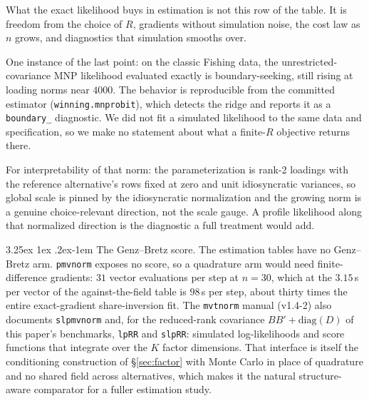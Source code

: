 \documentclass[11pt]{article}
\makeatletter
\renewcommand\paragraph{\@startsection{paragraph}{4}{\z@}%
  {3.25ex \@plus1ex \@minus.2ex}{-1em}%
  {\normalfont\normalsize\itshape}}
\makeatother
\begin{document}
What the exact likelihood buys in estimation is not this row of the
table. It is freedom from the choice of $R$, gradients without simulation
noise, the cost law as $n$ grows, and diagnostics that simulation smooths
over.

One instance of the last point: on the classic Fishing data, the
unrestricted-covariance MNP likelihood evaluated exactly is
boundary-seeking, still rising at loading norms near $4000$. The behavior is
reproducible from the committed estimator (\texttt{winning.mnprobit}),
which detects the ridge and reports it as a \texttt{boundary\_}
diagnostic. We did not fit a simulated likelihood to the same data and
specification, so we make no statement about what a finite-$R$ objective
returns there.

For interpretability of that norm: the parameterization is rank-2
loadings with the reference alternative's rows fixed at zero and unit
idiosyncratic variances, so global scale is pinned by the idiosyncratic
normalization and the growing norm is a genuine choice-relevant
direction, not the scale gauge. A profile likelihood along that
normalized direction is the diagnostic a full treatment would add.

\paragraph{The Genz--Bretz score.} The estimation tables have no
Genz--Bretz arm. \texttt{pmvnorm} exposes no score, so a quadrature arm
would need finite-difference gradients: $31$ vector evaluations per step
at $n=30$, which at the $3.15$\,s per vector of the against-the-field
table is $98$\,s per step, about thirty times the entire
exact-gradient share-inversion fit. The \texttt{mvtnorm} manual (v1.4-2)
also documents \texttt{slpmvnorm} and, for the reduced-rank covariance
$BB'+\mathrm{diag}(D)$ of this paper's benchmarks, \texttt{lpRR} and
\texttt{slpRR}: simulated log-likelihoods and score functions that
integrate over the $K$ factor dimensions. That interface is itself the
conditioning construction of \S\ref{sec:factor} with Monte Carlo in place
of quadrature and no shared field across alternatives, which makes it the
natural structure-aware comparator for a fuller estimation study.
\end{document}
